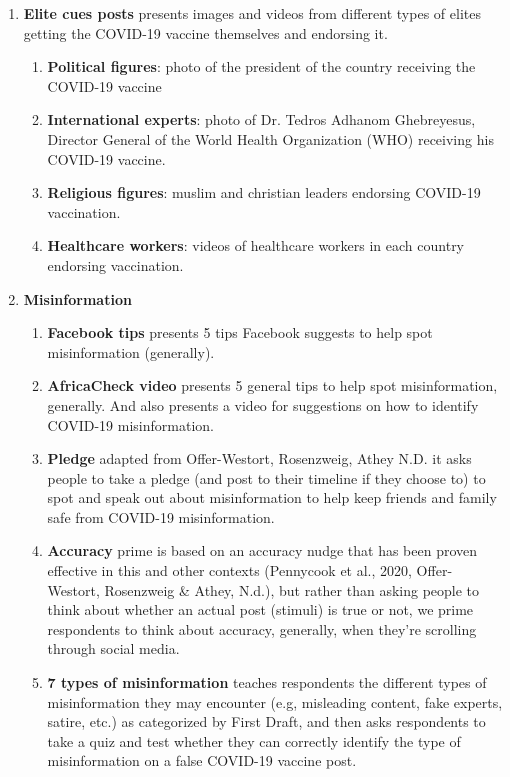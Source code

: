 \documentclass[letterpaper, 12pt, parskip=full,DIV=10]{scrartcl}
\begin{document}
\begin{enumerate}
  \item \textbf{Elite cues posts} presents images and videos from different types of elites getting the COVID-19 vaccine themselves and endorsing it. 
  \begin{enumerate}
    \item \textbf{Political figures}: photo of the president of the country receiving the COVID-19 vaccine
    \item \textbf{International experts}: photo of Dr. Tedros Adhanom Ghebreyesus, Director General of the World Health Organization (WHO) receiving his COVID-19 vaccine.
    \item \textbf{Religious figures}: muslim and christian leaders endorsing COVID-19 vaccination.
    \item \textbf{Healthcare workers}: videos of healthcare workers in each country endorsing vaccination.
  \end{enumerate}
  \item \textbf{Misinformation}
    \begin{enumerate}
    \item \textbf{Facebook tips} presents 5 tips Facebook suggests to help spot misinformation (generally).
    \item \textbf{AfricaCheck video} presents 5 general tips to help spot misinformation, generally. And also presents a video for suggestions on how to identify COVID-19 misinformation.
    \item \textbf{Pledge} adapted from Offer-Westort, Rosenzweig, Athey N.D. it asks people to take a pledge (and post to their timeline if they choose to) to spot and speak out about misinformation to help keep friends and family safe from COVID-19 misinformation.
    \item \textbf{Accuracy} prime is based on an accuracy nudge that has been proven effective in this and other contexts (Pennycook et al., 2020, Offer-Westort, Rosenzweig \& Athey, N.d.), but rather than asking people to think about whether an actual post (stimuli) is true or not, we prime respondents to think about accuracy, generally, when they’re scrolling through social media.
    \item \textbf{7 types of misinformation} teaches respondents the different types of misinformation they may encounter (e.g, misleading content, fake experts, satire, etc.) as categorized by First Draft, and then asks respondents to take a quiz and test whether they can correctly identify the type of misinformation on a false COVID-19 vaccine post. 
  \end{enumerate}
\end{enumerate}
\end{document}
